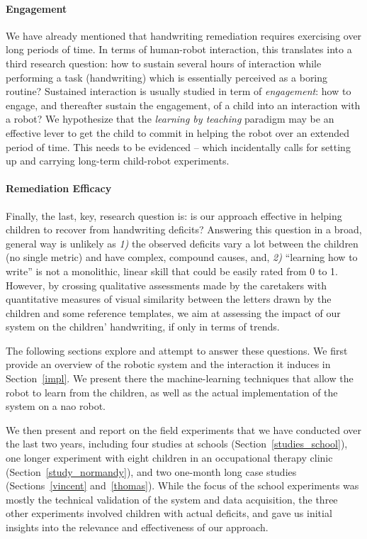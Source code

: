 \documentclass{article}
\begin{document}
\paragraph{Engagement} We have already mentioned that handwriting remediation
requires exercising over long periods of time. In terms of human-robot
interaction, this translates into a third research question: how to sustain
several hours of interaction while performing a task (handwriting) which is
essentially perceived as a boring routine? Sustained interaction is usually
studied in term of \emph{engagement}: how to engage, and thereafter sustain the
engagement, of a child into an interaction with a robot? We hypothesize that the
\emph{learning by teaching} paradigm may be an effective lever to get the child
to commit in helping the robot over an extended period of time. This needs to be
evidenced -- which incidentally calls for setting up and carrying long-term
child-robot experiments.

\paragraph{Remediation Efficacy} Finally, the last, key, research question is: is
our approach effective in helping children to recover from handwriting deficits?
Answering this question in a broad, general way is unlikely as {\it 1)} the
observed deficits vary a lot between the children (no single metric) and have
complex, compound causes, and, {\it 2)} ``learning how to write'' is not a
monolithic, linear skill that could be easily rated from 0 to 1.  However, by
crossing qualitative assessments made by the caretakers with quantitative
measures of visual similarity between the letters drawn by the children and some
reference templates, we aim at assessing the impact of our system on the
children' handwriting, if only in terms of trends.

\vspace{2em}
The following sections explore and attempt to answer these
questions. We first provide an
overview of the robotic system and the interaction it induces
in Section~\ref{impl}. We present there
the machine-learning techniques that allow the robot to learn from the children,
as well as the actual implementation of the system on a {\sc nao} robot.

We then present and report on the field experiments that we have conducted over
the last two years, including four studies at schools
(Section~\ref{studies_school}), one longer experiment with eight children in an
occupational therapy clinic (Section~\ref{study_normandy}), and two one-month
long case studies (Sections~\ref{vincent} and~\ref{thomas}). While the focus of
the school experiments was mostly the technical validation of the system and
data acquisition, the three other experiments involved children with actual
deficits, and gave us initial insights into the relevance and effectiveness of
our approach.
\end{document}
